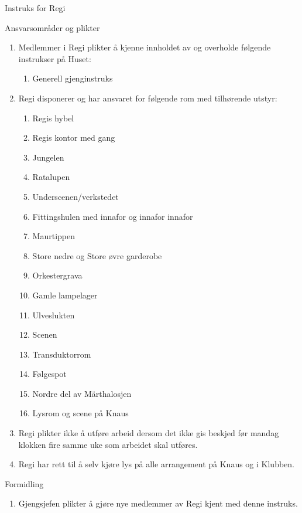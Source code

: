 \begin{instruks}{Instruks for Regi}{}{}
    \begin{instruksledd}{Ansvarsområder og plikter}
        \begin{enumerate}
            \item  Medlemmer i Regi plikter å kjenne innholdet av og overholde følgende
                instrukser på Huset:
                \begin{enumerate}
                    \item Generell gjenginstruks
                \end{enumerate}
            \item  Regi disponerer og har ansvaret for følgende rom med tilhørende utstyr:
                \begin{enumerate}
                    \item Regis hybel
                    \item Regis kontor med gang
                    \item Jungelen
                    \item Ratalupen
                    \item Underscenen/verkstedet
                    \item Fittingshulen med innafor og innafor innafor
                    \item Maurtippen
                    \item Store nedre og Store øvre garderobe
                    \item Orkestergrava
                    \item Gamle lampelager
                    \item Ulveslukten
                    \item Scenen
                    \item Transduktorrom
                    \item Følgespot
                    \item Nordre del av Märthalosjen
                    \item Lysrom og scene på Knaus
                \end{enumerate}
            \item Regi plikter ikke å utføre arbeid dersom det ikke gis beskjed før
                mandag klokken fire samme uke som arbeidet skal utføres. 
            \item  Regi har rett til å selv kjøre lys på alle arrangement på Knaus og i
                Klubben.
        \end{enumerate}
    \end{instruksledd}

    \begin{instruksledd}{Formidling}
        \begin{enumerate}
            \item Gjengsjefen plikter å gjøre nye medlemmer av Regi kjent med denne
                instruks.
        \end{enumerate}
    \end{instruksledd}

\end{instruks}
